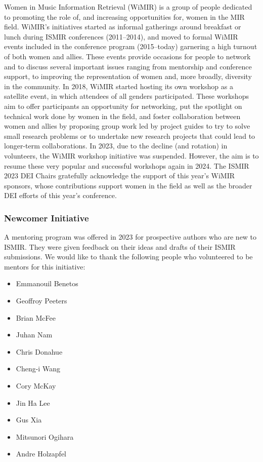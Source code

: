 Women in Music Information Retrieval (WiMIR) is a group of people dedicated to promoting the role of, and increasing opportunities for, women in the MIR field. WiMIR’s initiatives started as informal gatherings around breakfast or lunch during ISMIR conferences (2011–2014), and moved to formal WiMIR events included in the conference program (2015–today) garnering a high turnout of both women and allies. These events provide occasions for people to network and to discuss several important issues ranging from mentorship and conference support, to improving the representation of women and, more broadly, diversity in the community. In 2018, WiMIR started hosting its own workshop as a satellite event, in which attendees of all genders participated. These workshops aim to offer participants an opportunity for networking, put the spotlight on technical work done by women in the field, and foster collaboration between women and allies by proposing group work led by project guides to try to solve small research problems or to undertake new research projects that could lead to longer-term collaborations. In 2023, due to the decline (and rotation) in volunteers, the WiMIR workshop initiative was suspended. However, the aim is to resume these very popular and successful workshops again in 2024. The ISMIR 2023 DEI Chairs gratefully acknowledge the support of this year’s WiMIR sponsors, whose contributions support women in the field as well as the broader DEI efforts of this year’s conference.


\subsubsection*{Newcomer Initiative}

A mentoring program was offered in 2023 for prospective authors who are new to ISMIR. They were given feedback on their ideas and drafts of their ISMIR submissions. We would like to thank the following people who volunteered to be mentors for this initiative:
\begin{multicols}{3}\raggedcolumns
\begin{itemize}\setlength{\parskip}{0pt}
    \item Emmanouil Benetos
    \item Geoffroy Peeters
    \item Brian McFee
    \item Juhan Nam
    \item Chris Donahue
    \item Cheng-i Wang
    \item Cory McKay
    \item Jin Ha Lee
    \item Gus Xia
    \item Mitsunori Ogihara
    \item Andre Holzapfel
\end{itemize}
\end{multicols}

